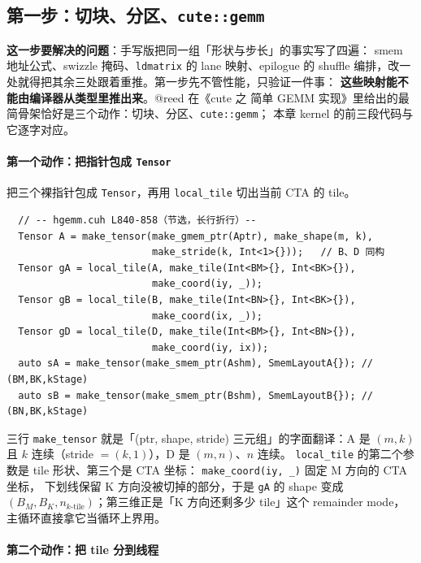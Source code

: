 \subsection{第一步：切块、分区、\texttt{cute::gemm}}\label{sec:24-step1}

\textbf{这一步要解决的问题}：手写版把同一组「形状与步长」的事实写了四遍：
smem 地址公式、swizzle 掩码、\texttt{ldmatrix} 的 lane 映射、epilogue 的
shuffle 编排，改一处就得把其余三处跟着重推。第一步先不管性能，只验证一件事：
\textbf{这些映射能不能由编译器从类型里推出来}。@reed 在《cute 之 简单 GEMM
实现》里给出的最简骨架恰好是三个动作：切块、分区、\texttt{cute::gemm}；
本章 kernel 的前三段代码与它逐字对应。

\paragraph{第一个动作：把指针包成 \texttt{Tensor}}

把三个裸指针包成 \texttt{Tensor}，再用
\texttt{local\_tile} 切出当前 CTA 的 tile。

\begin{lstlisting}
  // -- hgemm.cuh L840-858（节选，长行折行）--
  Tensor A = make_tensor(make_gmem_ptr(Aptr), make_shape(m, k),
                         make_stride(k, Int<1>{}));   // B、D 同构
  Tensor gA = local_tile(A, make_tile(Int<BM>{}, Int<BK>{}),
                         make_coord(iy, _));
  Tensor gB = local_tile(B, make_tile(Int<BN>{}, Int<BK>{}),
                         make_coord(ix, _));
  Tensor gD = local_tile(D, make_tile(Int<BM>{}, Int<BN>{}),
                         make_coord(iy, ix));
  auto sA = make_tensor(make_smem_ptr(Ashm), SmemLayoutA{}); // (BM,BK,kStage)
  auto sB = make_tensor(make_smem_ptr(Bshm), SmemLayoutB{}); // (BN,BK,kStage)
\end{lstlisting}

三行 \texttt{make\_tensor} 就是「(ptr, shape, stride) 三元组」的字面翻译：A 是
$(m,k)$ 且 $k$ 连续（stride $=(k,1)$），D 是 $(m,n)$、$n$ 连续。
\texttt{local\_tile} 的第二个参数是 tile 形状、第三个是 CTA 坐标：
\texttt{make\_\allowbreak{}coord\allowbreak{}(iy,\allowbreak{} \_\allowbreak{})} 固定 M 方向的 CTA 坐标，
下划线保留 K 方向没被切掉的部分，于是 \texttt{gA} 的 shape 变成
$(B_M, B_K, n_{k\text{-tile}})$；第三维正是「K 方向还剩多少 tile」这个
remainder mode，主循环直接拿它当循环上界用。

\paragraph{第二个动作：把 tile 分到线程}

